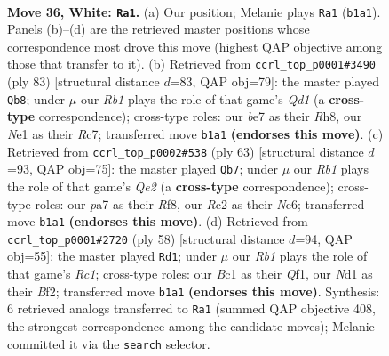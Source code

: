 \documentclass[11pt]{article}
\begin{document}
\begin{figure}[p]
\label{fig:thought-m68}
\end{figure}

\clearpage

\begin{figure}[p]\centering
\begin{subfigure}{0.46\textwidth}\centering
\resizebox{\linewidth}{!}{%
\newchessgame
\chessboard[
  setfen={nr4k1/p2qbrn1/b7/P1p2p1p/3p1Pp1/1P4P1/Q1R1P1BP/1RBNN1K1 w - - 4 36},
  showmover=false,
  pgfstyle=straightmove, color=movearrow, markmove={b1-a1}
]}
\caption{}
\end{subfigure}\hfill
\begin{subfigure}{0.46\textwidth}\centering
\resizebox{\linewidth}{!}{%
\newchessgame
\chessboard[
  setfen={3q3r/p1r1bpk1/1pbp2p1/4p2p/P1P1P3/1PNR1B1P/1Q3PP1/4R1K1 b - - 26 42},
  showmover=false,
  pgfstyle=straightmove, color=movearrow, markmove={d8-b8}
]}
\caption{}
\end{subfigure}
\\[4pt]
\begin{subfigure}{0.46\textwidth}\centering
\resizebox{\linewidth}{!}{%
\newchessgame
\chessboard[
  setfen={4brk1/4q1p1/2n1pr1p/p2p3P/2pP1b2/P1B2N1R/1P2RPP1/1B1Q1K2 b - - 18 32},
  showmover=false,
  pgfstyle=straightmove, color=movearrow, markmove={e7-b7}
]}
\caption{}
\end{subfigure}\hfill
\begin{subfigure}{0.46\textwidth}\centering
\resizebox{\linewidth}{!}{%
\newchessgame
\chessboard[
  setfen={q2r1nk1/pbr1bpp1/1p2p2p/1B2P2P/P2N1P2/2P1R3/5BPK/2R2Q2 w - - 7 30},
  showmover=false,
  pgfstyle=straightmove, color=movearrow, markmove={c1-d1}
]}
\caption{}
\end{subfigure}
\caption{\textbf{Move 36, White: \texttt{Ra1}.} (a) Our position; Melanie plays \texttt{Ra1} (\texttt{b1a1}). Panels (b)--(d) are the retrieved master positions whose correspondence most drove this move (highest QAP objective among those that transfer to it). (b) Retrieved from \texttt{ccrl\_top\_p0001\#3490} (ply 83) [structural distance $d$=83, QAP obj=79]: the master played \texttt{Qb8}; under $\mu$ our \emph{Rb1} plays the role of that game's \emph{Qd1} (a \textbf{cross-type} correspondence); cross-type roles: our \emph{b}e7 as their \emph{R}h8, our \emph{N}e1 as their \emph{R}c7; transferred move \texttt{b1a1} \textbf{(endorses this move)}. (c) Retrieved from \texttt{ccrl\_top\_p0002\#538} (ply 63) [structural distance $d$=93, QAP obj=75]: the master played \texttt{Qb7}; under $\mu$ our \emph{Rb1} plays the role of that game's \emph{Qe2} (a \textbf{cross-type} correspondence); cross-type roles: our \emph{p}a7 as their \emph{R}f8, our \emph{R}c2 as their \emph{N}c6; transferred move \texttt{b1a1} \textbf{(endorses this move)}. (d) Retrieved from \texttt{ccrl\_top\_p0001\#2720} (ply 58) [structural distance $d$=94, QAP obj=55]: the master played \texttt{Rd1}; under $\mu$ our \emph{Rb1} plays the role of that game's \emph{Rc1}; cross-type roles: our \emph{B}c1 as their \emph{Q}f1, our \emph{N}d1 as their \emph{B}f2; transferred move \texttt{b1a1} \textbf{(endorses this move)}. Synthesis: 6 retrieved analogs transferred to \texttt{Ra1} (summed QAP objective 408, the strongest correspondence among the candidate moves); Melanie committed it via the \texttt{search} selector.}

\end{figure}
\end{document}
